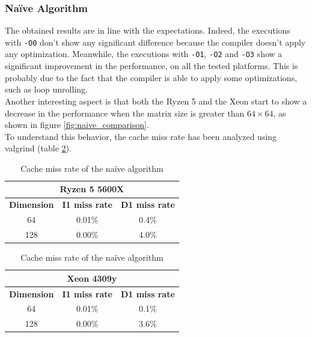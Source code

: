 \documentclass{IEEEconf}
\begin{document}
\subsubsection{Na\"{i}ve Algorithm}
The obtained results are in line with the expectations. Indeed, the executions with \texttt{-O0} don't show any significant difference because the compiler 
doesn't apply any optimization. Meanwhile, the executions with \texttt{-O1}, \texttt{-O2} and \texttt{-O3} show a significant improvement in the performance, on all
the tested platforms. This is probably due to the fact that the compiler is able to apply some optimizations, such as loop unrolling. \\
Another interesting aspect is that both the Ryzen 5 and the Xeon start to show a decrease in the performance when the matrix size is greater than $64 \times 64$, 
as shown in figure \ref{fig:naive_comparison}. \\
To understand this behavior, the cache miss rate has been analyzed using valgrind (table \ref{tab:naive_cache_miss}). \\ 
\begin{table}[h]
    \centering
    \begin{tabular}{|c|c|c|}
        \hline
        \multicolumn{3}{|c|}{\textbf{Ryzen 5 5600X}} \\
        \hline
        \textbf{Dimension}            & \textbf{I1 miss rate} & \textbf{D1 miss rate} \\ \hline
        64                   & 0.01\%       & 0.4\%        \\ \hline
        128                  & 0.00\%       & 4.0\%        \\ \hline 
    \end{tabular}
    \hspace{2em}
    \begin{tabular}{|c|c|c|}
        \hline
        \multicolumn{3}{|c|}{\textbf{Xeon 4309y}} \\
        \hline
        \textbf{Dimension}            & \textbf{I1 miss rate} & \textbf{D1 miss rate} \\ \hline
        64                   & 0.01\%       & 0.1\%        \\ \hline
        128                  & 0.00\%       & 3.6\%        \\ \hline 
    \end{tabular}
    \caption{Cache miss rate of the na\"{i}ve algorithm}
    \label{tab:naive_cache_miss}
\end{table}
\end{document}
